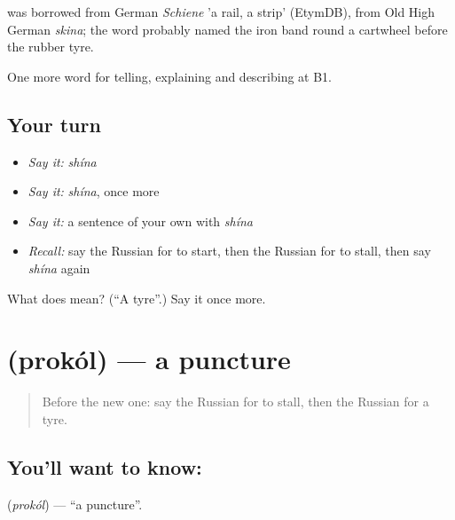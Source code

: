 \begin{cousinweb}
\emph{} was borrowed from German \emph{Schiene} 'a rail, a strip' (EtymDB), from Old High German \emph{skina}; the word probably named the iron band round a cartwheel before the rubber tyre.
\end{cousinweb}

\begin{grammarlens}[title={What you've built}]
One more word for telling, explaining and describing at B1.
\end{grammarlens}

\subsection*{Your turn}
\begin{itemize}
\raggedright
  \item \emph{Say it:} \emph{shína}
  \item \emph{Say it:} \emph{shína}, once more
  \item \emph{Say it:} a sentence of your own with \emph{shína}
  \item \emph{Recall:} say the Russian for to start, then the Russian for to stall, then say \emph{shína} again
\end{itemize}

\begin{tcolorbox}[breakable,colback=teal!4,colframe=teal!35!black,title={Before you move on}]
What does  mean? (\textquotedblleft{}A tyre\textquotedblright{}.) Say it once more.
\end{tcolorbox}
\section[\texorpdfstring{\ru{прокол} (prokól)}{прокол (prokól)}]{ (prokól) — a puncture}

\label{lesson:RU-C405-prokol}



\begin{quote}
Before the new one: say the Russian for to stall, then the Russian for a tyre.
\end{quote}

\subsection*{You'll want to know: }
\textbf{} (\emph{prokól}) — \textquotedblleft{}a puncture\textquotedblright{}.

